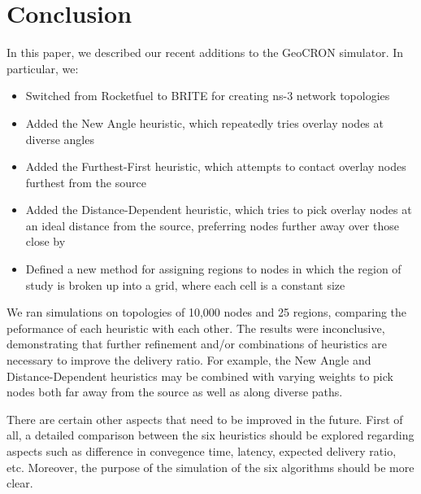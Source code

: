 \documentclass[conference]{IEEEtran}
\begin{document}

\newpage

\section{Conclusion}
In this paper, we described our recent additions to the GeoCRON simulator.
In particular, we:

\begin{itemize}
 \item Switched from Rocketfuel to BRITE for creating ns-3 network topologies
\item Added the New Angle heuristic, which repeatedly tries overlay nodes at diverse angles
\item Added the Furthest-First heuristic, which attempts to contact overlay nodes furthest from the source
\item Added the Distance-Dependent heuristic, which tries to pick overlay nodes at an ideal distance from the source, preferring nodes further away over those close by
\item Defined a new method for assigning regions to nodes in which the region of study is broken up into a grid, where each cell is a constant size
\end{itemize}

We ran simulations on topologies of 10,000 nodes and 25 regions, comparing the peformance of each heuristic with each other.
The results were inconclusive, demonstrating that further refinement and/or combinations of heuristics are necessary to improve the delivery ratio.
For example, the New Angle and Distance-Dependent heuristics may be combined with varying weights to pick nodes both far away from the source as well as along diverse paths.

There are certain other aspects that need to be improved in the future.
First of all, a detailed comparison between the six heuristics should be explored regarding aspects such as difference in convegence time, latency, expected delivery ratio, etc.
Moreover, the purpose of the simulation of the six algorithms should be more clear.




\end{document}
